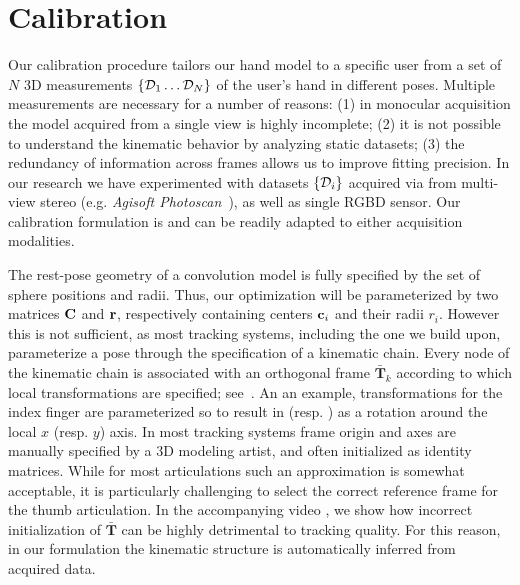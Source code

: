 
\section{Calibration}
Our calibration procedure tailors our hand model to a specific user from a set of $N$ 3D measurements $\{ \mathcal{D}_1 \dots \mathcal{D}_N \}$ of the user's hand in different poses. Multiple measurements are necessary for a number of reasons: (1) in monocular acquisition the model acquired from a single view is highly incomplete; (2) it is not possible to understand the kinematic behavior by analyzing static datasets; (3) the redundancy of information across frames allows us to improve fitting precision. In our research we have experimented with datasets $\{\mathcal{D}_i\}$ acquired via from multi-view stereo (e.g. \emph{Agisoft Photoscan~\textcopyright}), as well as single RGBD sensor. Our calibration formulation is  and can be readily adapted to either acquisition modalities.

The rest-pose geometry of a convolution model is fully specified by the set of sphere positions and radii. Thus, our optimization will be parameterized by two matrices ${\mathbf{C}}$ and ${\mathbf{r}}$, respectively containing centers $\mathbf{c}_i$ and their radii $r_i$. However this is not sufficient, as most tracking systems, including the one we build upon, parameterize a pose through the specification of a kinematic chain. 
Every node of the kinematic chain is associated with an orthogonal frame $\mathbf{\bar{T}}_k$ according to which local transformations are specified; see~. An an example, transformations for the index finger are parameterized so to result in  (resp. ) as a rotation around the local $x$ (resp. $y$) axis. In most tracking systems frame origin and axes are manually specified by a 3D modeling artist, and often initialized as identity matrices. While for most articulations such an approximation is somewhat acceptable, it is particularly challenging to select the correct reference frame for the thumb articulation. In the accompanying video \todo{[00:00]}, we show how incorrect initialization of $\mathbf{\bar{T}}$ can be highly detrimental to tracking quality. For this reason, in our formulation the kinematic structure is automatically inferred from acquired data.

